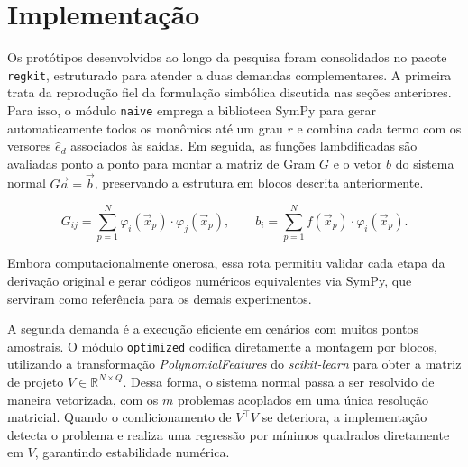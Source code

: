 \section{Implementação}

\graphicspath{{img/}{../img/}{../../img/}}

\streammetrics

\of\streammetrics
\edef\streamFullRmse{\pgfplotsretval}
\of\streammetrics
\edef\streamIncrementalRmse{\pgfplotsretval}
\of\streammetrics
\edef\streamFullCoefDiff{\pgfplotsretval}
\of\streammetrics
\edef\streamIncrementalCoefDiff{\pgfplotsretval}

Os protótipos desenvolvidos ao longo da pesquisa foram consolidados no pacote
\texttt{regkit}, estruturado para atender a duas demandas complementares. A
primeira trata da reprodução fiel da formulação simbólica discutida nas seções
anteriores. Para isso, o módulo \texttt{naive} emprega a biblioteca SymPy para
gerar automaticamente todos os monômios até um grau $r$ e combina cada termo
com os versores $\hat e_d$ associados às saídas. Em seguida, as funções
lambdificadas são avaliadas ponto a ponto para montar a matriz de Gram $G$ e o
vetor $b$ do sistema normal $G\vec{a}=\vec{b}$, preservando a estrutura em
blocos descrita anteriormente.

\begin{equation*}
    G_{ij} =
    \sum_{p=1}^{N} \varphi_i(\vec{x}_p) \cdot \varphi_j(\vec{x}_p),
    \qquad
    b_i = \sum_{p=1}^{N} f(\vec{x}_p) \cdot \varphi_i(\vec{x}_p).
\end{equation*}

Embora computacionalmente onerosa, essa rota permitiu validar cada etapa da
derivação original e gerar códigos numéricos equivalentes via SymPy, que
serviram como referência para os demais experimentos.

A segunda demanda é a execução eficiente em cenários com muitos pontos
amostrais. O módulo \texttt{optimized} codifica diretamente a montagem por
blocos, utilizando a transformação \textit{PolynomialFeatures} do
\textit{scikit-learn} para obter a matriz de projeto $V \in \mathbb{R}^{N \times
Q}$. Dessa forma, o sistema normal passa a ser resolvido de maneira vetorizada,
com os $m$ problemas acoplados em uma única resolução matricial. Quando o
condicionamento de $V^{\top}V$ se deteriora, a implementação detecta o
problema e realiza uma regressão por mínimos quadrados diretamente em $V$,
garantindo estabilidade numérica\cite{burden_faires_2011}.

